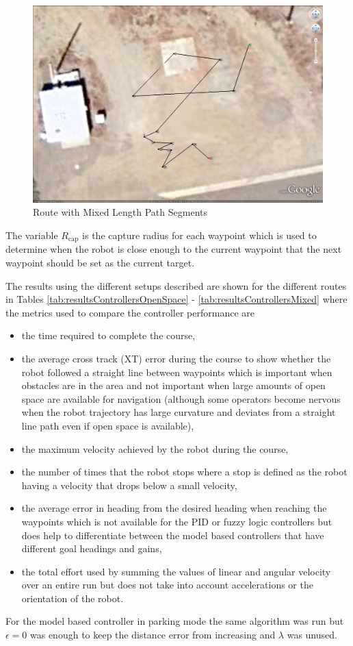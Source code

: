 \begin{itemize}
\begin{figure}[ht!]
	\centering
	\includegraphics[width=.5\textwidth]{images/GE/GEMixedSegmentsRoute2}
	\caption{Route with Mixed Length Path Segments}
	\label{fig:routeMixed}
\end{figure}
\end{itemize}
The variable $R_{\text{cap}}$ is the capture radius for each waypoint which is used to determine when the robot is close enough to the current waypoint that the next waypoint should be set as the current target.

The results using the different setups described are shown for the different routes in Tables \ref{tab:resultsControllersOpenSpace} - \ref{tab:resultsControllersMixed} where the metrics used to compare the controller performance are
\begin{itemize}
\item the time required to complete the course,
\item the average cross track (XT) error during the course to show whether the robot followed a straight line between waypoints which is important when obstacles are in the area and not important when large amounts of open space are available for navigation (although some operators become nervous when the robot trajectory has large curvature and deviates from a straight line path even if open space is available),
\item the maximum velocity achieved by the robot during the course,
\item the number of times that the robot stops where a stop is defined as the robot having a velocity that drops below a small velocity,
\item the average error in heading from the desired heading when reaching the waypoints which is not available for the PID or fuzzy logic controllers but does help to differentiate between the model based controllers that have different goal headings and gains,
\item the total effort used by summing the values of linear and angular velocity over an entire run but does not take into account accelerations or the orientation of the robot.
\end{itemize}
For the model based controller in parking mode the same algorithm was run but $\epsilon=0$ was enough to keep the distance error from increasing and $\lambda$ was unused.

